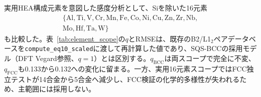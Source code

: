 \documentclass[5p,10pt]{elsarticle}
\begin{document}
実用HEA構成元素を意図した感度分析として、Siを除いた16元素
\[
\begin{gathered}
\{\mathrm{Al,Ti,V,Cr,Mn,Fe,Co,Ni,Cu,Zn,Zr,Nb,}\\
\mathrm{Mo,Hf,Ta,W}\}
\end{gathered}
\]
も比較した。表~\ref{tab:element_scope}の$q$とRMSEは、既存のB2/L1$_2$ペアデータベースを\texttt{compute\_eq10\_scaled}に渡して再計算した値であり、SQS-BCCの採用モデル（DFT Vegard参照、$q=1$）とは区別する。$q_\text{BCC}$は両スコープで完全に不変、$q_\text{FCC}$も0.133から0.132への変化に留まる。一方、実用16元素スコープではFCC独立テストが14合金から5合金へ減少し、FCC検証の化学的多様性が失われるため、主範囲には採用しない。

\begin{table}[H]
\centering
\caption{基礎データベース、HEA検証スコープ、実用元素スコープの関係。元素数は、基礎DBでは全対象、検証スコープでは校正64合金と独立31合金の和集合、実用スコープではSiを除いた定義上の16元素を示す。Beは基礎DBには含まれるが、HEA検証・Chen統合のいずれにも出現しない。}
\label{tab:population_scope}
\scriptsize
{}
\end{table}
\end{document}
